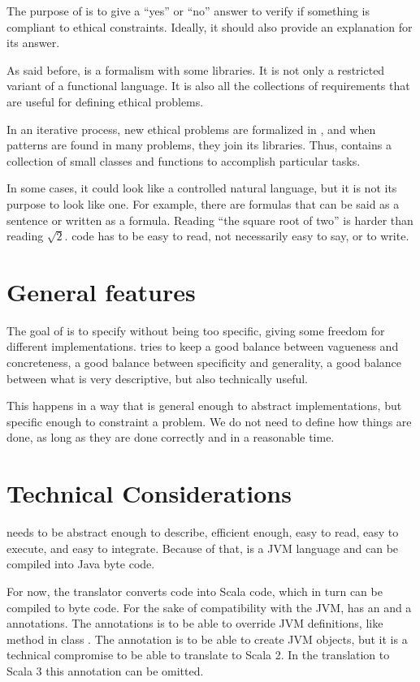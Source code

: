 The purpose of \Soda is to give a ``yes'' or ``no'' answer to verify if something is compliant to ethical constraints.
Ideally, it should also provide an explanation for its answer.

As said before, \Soda is a formalism with some libraries.
It is not only a restricted variant of a functional language.
It is also all the collections of requirements that are useful for defining ethical problems.

In an iterative process, new ethical problems are formalized in \Soda, and when patterns are found in many problems, they join its libraries.
Thus, \Soda contains a collection of small classes and functions to accomplish particular tasks.

In some cases, it could look like a controlled natural language, but it is not its purpose to look like one.
For example, there are formulas that can be said as a sentence or written as a formula.
Reading ``the square root of two'' is harder than reading $\sqrt{2}$.
\Soda code has to be easy to read, not necessarily easy to say, or to write.


\section{General features}

The goal of \Soda is to specify without being too specific, giving some freedom for different implementations.
\Soda tries to keep a good balance between vagueness and concreteness, a good balance between specificity and generality,
a good balance between what is very descriptive, but also technically useful.

This happens in a way that is general enough to abstract implementations, but specific enough to constraint a problem.
We do not need to define how things are done, as long as they are done correctly and in a reasonable time.


\section{Technical Considerations}

\Soda needs to be abstract enough to describe, efficient enough, easy to read, easy to execute, and easy to integrate.
Because of that, \Soda is a JVM language and can be compiled into Java byte code.

For now, the translator converts \Soda code into Scala code, which in turn can be compiled to byte code.
For the sake of compatibility with the JVM, \Soda has an \soverride and a \snew annotations.
The \soverride annotations is to be able to override JVM definitions, like method  in class .
The \snew annotation is to be able to create JVM objects, but it is a technical compromise to be able to translate to Scala 2.
In the translation to Scala 3 this annotation can be omitted.

